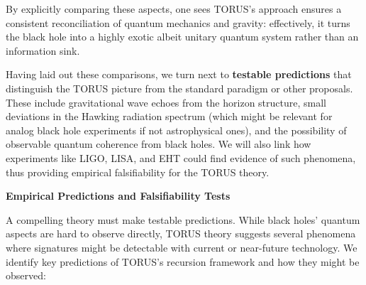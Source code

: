 \documentclass[]{article}
\begin{document}
By explicitly comparing these aspects, one sees TORUS's approach ensures
a consistent reconciliation of quantum mechanics and gravity:
effectively, it turns the black hole into a highly exotic albeit unitary
quantum system rather than an information sink.

Having laid out these comparisons, we turn next to \textbf{testable
predictions} that distinguish the TORUS picture from the standard
paradigm or other proposals. These include gravitational wave echoes
from the horizon structure, small deviations in the Hawking radiation
spectrum (which might be relevant for analog black hole experiments if
not astrophysical ones), and the possibility of observable quantum
coherence from black holes. We will also link how experiments like LIGO,
LISA, and EHT could find evidence of such phenomena, thus providing
empirical falsifiability for the TORUS theory.

\textbf{Empirical Predictions and Falsifiability Tests}

A compelling theory must make testable predictions. While black holes'
quantum aspects are hard to observe directly, TORUS theory suggests
several phenomena where signatures might be detectable with current or
near-future technology. We identify key predictions of TORUS's recursion
framework and how they might be observed:
\end{document}
